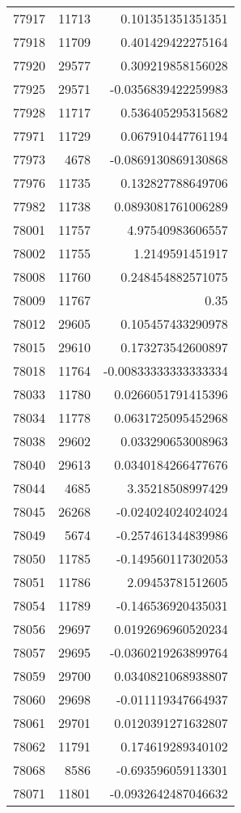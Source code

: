 \begin{tabular}{r | r | r}
77917 & 11713 & 0.101351351351351 \\
77918 & 11709 & 0.401429422275164 \\
77920 & 29577 & 0.309219858156028 \\
77925 & 29571 & -0.0356839422259983 \\
77928 & 11717 & 0.536405295315682 \\
77971 & 11729 & 0.067910447761194 \\
77973 & 4678 & -0.0869130869130868 \\
77976 & 11735 & 0.132827788649706 \\
77982 & 11738 & 0.0893081761006289 \\
78001 & 11757 & 4.97540983606557 \\
78002 & 11755 & 1.2149591451917 \\
78008 & 11760 & 0.248454882571075 \\
78009 & 11767 & 0.35 \\
78012 & 29605 & 0.105457433290978 \\
78015 & 29610 & 0.173273542600897 \\
78018 & 11764 & -0.00833333333333334 \\
78033 & 11780 & 0.0266051791415396 \\
78034 & 11778 & 0.0631725095452968 \\
78038 & 29602 & 0.033290653008963 \\
78040 & 29613 & 0.0340184266477676 \\
78044 & 4685 & 3.35218508997429 \\
78045 & 26268 & -0.024024024024024 \\
78049 & 5674 & -0.257461344839986 \\
78050 & 11785 & -0.149560117302053 \\
78051 & 11786 & 2.09453781512605 \\
78054 & 11789 & -0.146536920435031 \\
78056 & 29697 & 0.0192696960520234 \\
78057 & 29695 & -0.0360219263899764 \\
78059 & 29700 & 0.0340821068938807 \\
78060 & 29698 & -0.011119347664937 \\
78061 & 29701 & 0.0120391271632807 \\
78062 & 11791 & 0.174619289340102 \\
78068 & 8586 & -0.693596059113301 \\
78071 & 11801 & -0.0932642487046632 \\

\end{tabular}
